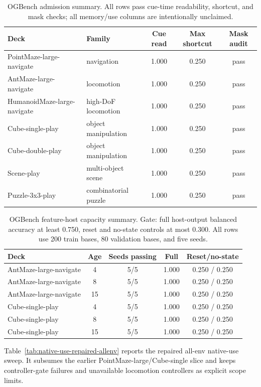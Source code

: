 \begin{table}[H]
\centering
\footnotesize
\caption{OGBench admission summary.  All rows pass cue-time readability,
shortcut, and mask checks; all memory/use columns are intentionally unclaimed.}
\begin{tabularx}{\linewidth}{lYccc}
\toprule
Deck & Family & Cue read & Max shortcut & Mask audit\\
\midrule
PointMaze-large-navigate & navigation & 1.000 & 0.250 & pass\\
AntMaze-large-navigate & locomotion & 1.000 & 0.250 & pass\\
HumanoidMaze-large-navigate & high-DoF locomotion & 1.000 & 0.250 & pass\\
Cube-single-play & object manipulation & 1.000 & 0.250 & pass\\
Cube-double-play & object manipulation & 1.000 & 0.250 & pass\\
Scene-play & multi-object scene & 1.000 & 0.250 & pass\\
Puzzle-3x3-play & combinatorial puzzle & 1.000 & 0.250 & pass\\
\bottomrule
\end{tabularx}
\end{table}

\begin{table}[H]
\centering
\footnotesize
\caption{OGBench feature-host capacity summary.  Gate: full host-output
balanced accuracy at least 0.750, reset and no-state controls at most 0.300.
All rows use 200 train bases, 80 validation bases, and five seeds.}
\begin{tabular}{lcccc}
\toprule
Deck & Age & Seeds passing & Full & Reset/no-state\\
\midrule
AntMaze-large-navigate & 4  & 5/5 & 1.000 & 0.250 / 0.250\\
AntMaze-large-navigate & 8  & 5/5 & 1.000 & 0.250 / 0.250\\
AntMaze-large-navigate & 15 & 5/5 & 1.000 & 0.250 / 0.250\\
Cube-single-play       & 4  & 5/5 & 1.000 & 0.250 / 0.250\\
Cube-single-play       & 8  & 5/5 & 1.000 & 0.250 / 0.250\\
Cube-single-play       & 15 & 5/5 & 1.000 & 0.250 / 0.250\\
\bottomrule
\end{tabular}
\end{table}

Table~\ref{tab:native-use-repaired-allenv} reports the repaired all-env
native-use sweep.  It subsumes the earlier PointMaze-large/Cube-single slice
and keeps controller-gate failures and unavailable locomotion controllers as
explicit scope limits.

